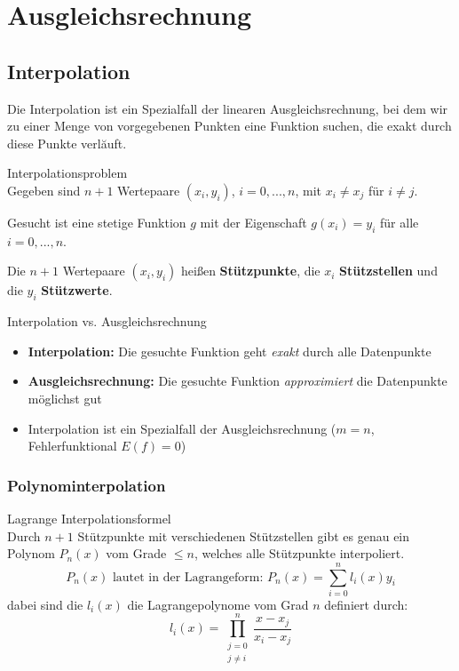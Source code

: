 \section{Ausgleichsrechnung}

\subsection{Interpolation}

\begin{remark}
Die Interpolation ist ein Spezialfall der linearen Ausgleichsrechnung, bei dem wir zu einer Menge von vorgegebenen Punkten eine Funktion suchen, die exakt durch diese Punkte verlăuft.
\end{remark}

\begin{definition}{Interpolationsproblem}\\
Gegeben sind $n+1$ Wertepaare $(x_i, y_i)$, $i = 0, ..., n$, mit $x_i \neq x_j$ für $i \neq j$. 

Gesucht ist eine stetige Funktion $g$ mit der Eigenschaft $g(x_i) = y_i$ für alle $i = 0, ..., n$.

Die $n+1$ Wertepaare $(x_i, y_i)$ heißen \textbf{Stützpunkte}, die $x_i$ \textbf{Stützstellen} und die $y_i$ \textbf{Stützwerte}.
\end{definition}

\begin{concept}{Interpolation vs. Ausgleichsrechnung}
\begin{itemize}
    \item \textbf{Interpolation:} Die gesuchte Funktion geht \emph{exakt} durch alle Datenpunkte
    \item \textbf{Ausgleichsrechnung:} Die gesuchte Funktion \emph{approximiert} die Datenpunkte möglichst gut
    \item Interpolation ist ein Spezialfall der Ausgleichsrechnung ($m = n$, Fehlerfunktional $E(f) = 0$)
\end{itemize}
\end{concept}

\subsubsection{Polynominterpolation}

\begin{theorem}{Lagrange Interpolationsformel}\\
Durch $n+1$ Stützpunkte mit verschiedenen Stützstellen gibt es genau ein Polynom $P_n(x)$ vom Grade $\leq n$, welches alle Stützpunkte interpoliert.
$$P_n(x) \text{ lautet in der Lagrangeform: } P_n(x) = \sum_{i=0}^{n} l_i(x) y_i$$
dabei sind die $l_i(x)$ die Lagrangepolynome vom Grad $n$ definiert durch:
$$l_i(x) = \prod_{\substack{j=0 \\ j \neq i}}^{n} \frac{x - x_j}{x_i - x_j}$$
\end{theorem}

